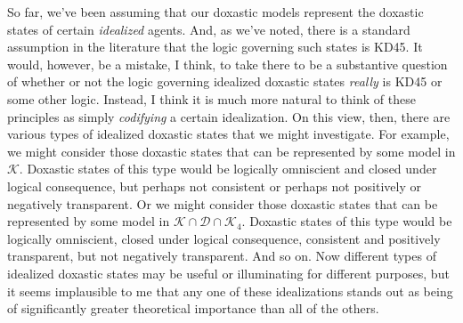 So far, we've been assuming that our doxastic models represent the doxastic states of certain \textit{idealized} agents.
And, as we've noted, there is a standard assumption in the literature that the logic governing such states is KD45.
It would, however, be a mistake, I think, to take there to be a substantive question of whether or not the logic governing idealized doxastic states \textit{really} is KD45 or some other logic.
Instead, I think it is much more natural to think of these principles as simply \textit{codifying} a certain idealization. 
On this view, then, there are various types of idealized doxastic states that we might investigate.
For example, we might consider those doxastic states that can be represented by some model in $\mathcal{K}$.
Doxastic states of this type would be logically omniscient and closed under logical consequence, but perhaps not consistent or perhaps not positively or negatively transparent.
Or we might consider those doxastic states that can be represented by some model in $ \mathcal{K} \cap \mathcal{D} \cap \mathcal{K}_4$.
Doxastic states of this type would be logically omniscient, closed under logical consequence, consistent and positively transparent, but not negatively transparent.
And so on.
Now different types of idealized doxastic states may be useful or illuminating for different purposes, but it seems implausible to me that any one of these idealizations stands out as being of significantly greater theoretical importance than all of the others.

